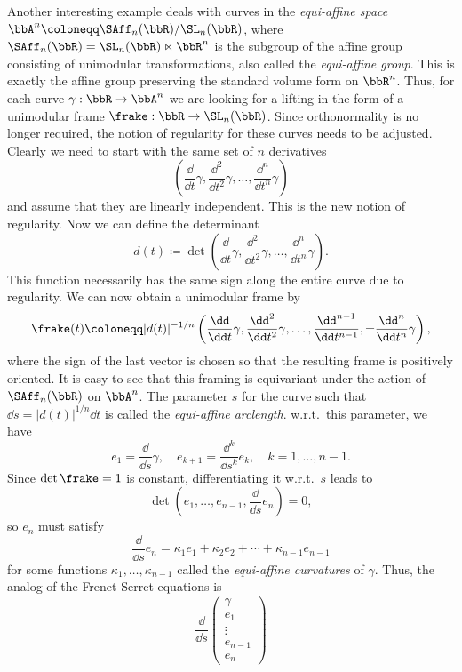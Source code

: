 \begin{example}
    Another interesting example deals with curves in the \emph{equi-affine space} $\bbA^n\coloneqq \SAff_n(\bbR)\slash\SL_n(\bbR)$, where $\SAff_n(\bbR)=\SL_n(\bbR)\ltimes\bbR^n$ is the subgroup of the affine group consisting of unimodular transformations, also called the \emph{equi-affine group}. This is exactly the affine group preserving the standard volume form on $\bbR^n$. Thus, for each curve $\gamma:\bbR\to \bbA^n$ we are looking for a lifting in the form of a unimodular frame $\frake:\bbR\to \SL_n(\bbR)$. Since orthonormality is no longer required, the notion of regularity for these curves needs to be adjusted. Clearly we need to start with the same set of $n$ derivatives
    \[\left(\frac{\dd}{\dd t}\gamma,\frac{\dd^2}{\dd t^2}\gamma,\ldots,\frac{\dd^{n}}{\dd t^{n}}\gamma\right)\]
    and assume that they are linearly independent. This is the new notion of regularity. Now we can define the determinant
    \[d(t)\coloneqq \det\left(\frac{\dd}{\dd t}\gamma,\frac{\dd^2}{\dd t^2}\gamma,\ldots,\frac{\dd^{n}}{\dd t^{n}}\gamma\right).\]
    This function necessarily has the same sign along the entire curve due to regularity. We can now obtain a unimodular frame by 
    \[\frake(t)\coloneqq |d(t)|^{-1/n}\left(\frac{\dd}{\dd t}\gamma,\frac{\dd^2}{\dd t^2}\gamma,\ldots,\frac{\dd^{n-1}}{\dd t^{n-1}},\pm\frac{\dd^{n}}{\dd t^{n}}\gamma\right),\]
    where the sign of the last vector is chosen so that the resulting frame is positively oriented. It is easy to see that this framing is equivariant under the action of $\SAff_n(\bbR)$ on $\bbA^n$. The parameter $s$ for the curve such that $\dd s=|d(t)|^{1/n}\dd t$ is called the \emph{equi-affine arclength}. w.r.t.\ this parameter, we have 
    \[e_1=\frac{\dd}{\dd s}\gamma,\quad e_{k+1}=\frac{\dd^k}{\dd s^k} e_k,\quad k=1,\ldots,n-1.\]
    Since $\det\frake=1$ is constant, differentiating it w.r.t.\ $s$ leads to 
    \[\det\left(e_1,\ldots,e_{n-1},\frac{\dd}{\dd s}e_n\right)=0,\]
    so $e_n$ must satisfy 
    \[\frac{\dd}{\dd s}e_n=\kappa_1 e_1+\kappa_2 e_2+\cdots+\kappa_{n-1}e_{n-1}\]
    for some functions $\kappa_1,\ldots,\kappa_{n-1}$ called the \emph{equi-affine curvatures} of $\gamma$. Thus, the analog of the Frenet-Serret equations is 
    \[\frac{\dd}{\dd s} \begin{pmatrix}
    \gamma \\ e_1 \\ \vdots \\ e_{n-1} \\ e_n

\end{pmatrix}\]
\end{example}
